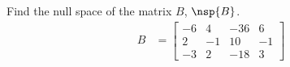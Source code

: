 Find the null space of the matrix $B$, $\nsp{B}$.
%
\begin{align*}
B&=
\begin{bmatrix}
 -6 & 4 & -36 & 6 \\
 2 & -1 & 10 & -1 \\
 -3 & 2 & -18 & 3
\end{bmatrix}
\end{align*}
%
